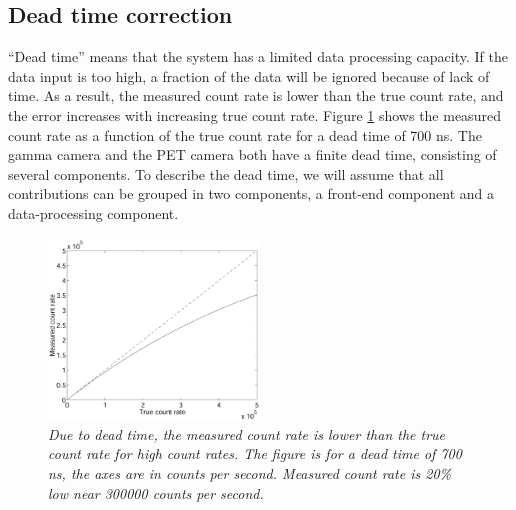 \documentclass[11pt,oneside]{book}
\begin{document}
\subsection{Dead time correction} \label{sec:deadtime}
``Dead time'' means that the system has a limited data processing capacity. If
the data input is too high, a fraction of the data will be ignored because of
lack of time. As a result, the measured count rate is lower than the true
count rate, and the error increases with increasing true count rate. Figure
\ref{fig:dead_time} shows the measured count rate as a function of the true
count rate for a dead time of 700 ns. The gamma camera and the PET camera both
have a finite dead time, consisting of several components. To describe the
dead time, we will assume that all contributions can be grouped in two
components, a front-end component and a data-processing component.

\begin{figure}[tb]
\centering
\includegraphics[width=0.5\textwidth]{figs/fig_dead_time.pdf}
\caption{\label{fig:dead_time} \emph{Due to dead time, the measured count rate
is lower than the true count rate for high count rates. The figure is for a
dead time of 700 ns, the axes are in counts per second. Measured count rate is
20\% low near 300000 counts per second.}}
\end{figure}
\end{document}
